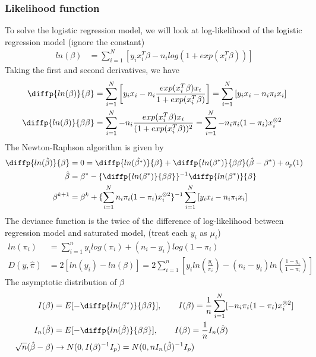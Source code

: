 \documentclass{article}
\begin{document}
 \subsubsection{Likelihood function} 
To solve the logistic regression model, we will look at log-likelihood of the logistic regression model (ignore the constant)
\begin{align*}
   ln(\beta) &= \sum_{i=1}^N \left[ y_i x_i^T \beta - n_i log(1+ exp( x_i^T\beta)) \right]
\end{align*}
Taking the first and second derivatives, we have
\begin{align*}
  \diffp {ln(\beta)}{\beta} &= \sum_{i=1}^N \left[ y_i x_i - n_i  \frac{exp(x_i^T\beta) x_i}{1+ exp(x_i^T\beta)} \right] = \sum_{i=1}^N \left[ y_i x_i - n_i  \pi_i x_i \right]\\
 \diffp {ln(\beta)}{\beta \beta} &=  \sum_{i=1}^N - n_i  \frac{exp(x_i^T\beta) x_i}{(1+ exp(x_i^T\beta))^2} =  \sum_{i=1}^N - n_i \pi_i (1-\pi_i) x_i^{\otimes 2}
\end{align*}
The Newton-Raphson algorithm is given by 
\begin{align*}
   \diffp {ln(\hat{\beta})}{\beta} &= 0 = \diffp {ln(\hat{\beta^{\ast}})}{\beta} +  \diffp {ln(\beta^{\ast})}{\beta \beta} (\hat{\beta} - \beta^{\ast}) + o_p(1)\\
   \hat{\beta} &=  \beta^{\ast} - \{ \diffp {ln(\beta^{\ast})}{\beta \beta} \}^{-1} \diffp {ln(\beta^{\ast})}{\beta} \\
   \beta^{k+1} &=\beta^{k} + \{\sum_{i=1}^N  n_i \pi_i (1-\pi_i) x_i^{\otimes 2}\}^{-1} \sum_{i=1}^N \left[ y_i x_i - n_i  \pi_i x_i \right]
\end{align*}
The deviance function is the twice of the difference of log-likelihood between regression model and saturated model, (treat each $y_i$ as $\mu_i$)
\begin{align*}
   ln(\pi_i) &= \sum_{i=1}^n y_i log(\pi_i) + (n_i - y_i) log(1-\pi_i) \\
   D(y, \hat{\pi}) &= 2[ ln(y_i) - ln(\beta)] =  2 \sum_{i=1}^n[y_i ln(\frac{y_i}{\pi_i}) - (n_i-y_i) ln(\frac{1-y_i}{1-\pi_i})] 
\end{align*}
The asymptotic distribution of $\beta$
\begin{align*}
 I(\beta) &=E[- \diffp {ln(\beta^{\ast})}{\beta \beta}], \qquad I(\beta) =\frac{1}{n} \sum_{i=1}^N [- n_i \pi_i (1-\pi_i) x_i^{\otimes 2} ]\\
 I_n(\hat{\beta}) &= E[- \diffp {ln(\hat{\beta})}{\beta \beta}], \qquad  I(\beta) = \frac{1}{n} I_n(\hat{\beta}) \\
 \sqrt{n}  ( \hat{\beta} -  \beta) &\rightarrow  N(0,  I(\beta)^{-1} I_p )  =  N(0, n I_n(\hat\beta)^{-1} I_p )  
\end{align*}
\end{document}
